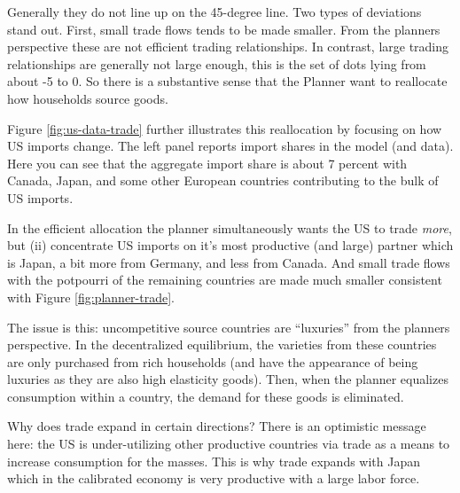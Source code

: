 \documentclass[12pt,pdftex]{article}
\begin{document}
\begin{onehalfspacing}
Generally they do not line up on the 45-degree line. Two types of deviations stand out. First, small trade flows tends to be made smaller. From the planners perspective these are not efficient trading relationships. In contrast, large trading relationships are generally not large enough, this is the set of dots lying from about -5 to 0. So there is a substantive sense that the Planner want to reallocate how households source goods.

Figure \ref{fig:us-data-trade} further illustrates this reallocation by focusing on how US imports change. The left panel reports import shares in the model (and data). Here you can see that the aggregate import share is about 7 percent with Canada, Japan, and some other European countries contributing to the bulk of US imports.

In the efficient allocation the planner simultaneously wants the US to trade \emph{more}, but (ii) concentrate US imports on it's most productive (and large) partner which is Japan, a bit more from Germany, and less from Canada. And small trade flows with the potpourri of the remaining countries are made much smaller consistent with Figure \ref{fig:planner-trade}.

The issue is this: uncompetitive source countries are ``luxuries'' from the planners perspective. In the decentralized equilibrium, the varieties from these countries are only purchased from rich households (and have the appearance of being luxuries as they are also high elasticity goods). Then, when the planner equalizes consumption within a country, the demand for these goods is eliminated.

Why does trade expand in certain directions? There is an optimistic message here: the US is under-utilizing other productive countries via trade as a means to increase consumption for the masses. This is why trade expands with Japan which in the calibrated economy is very productive with a large labor force.


\end{onehalfspacing}
\end{document}
